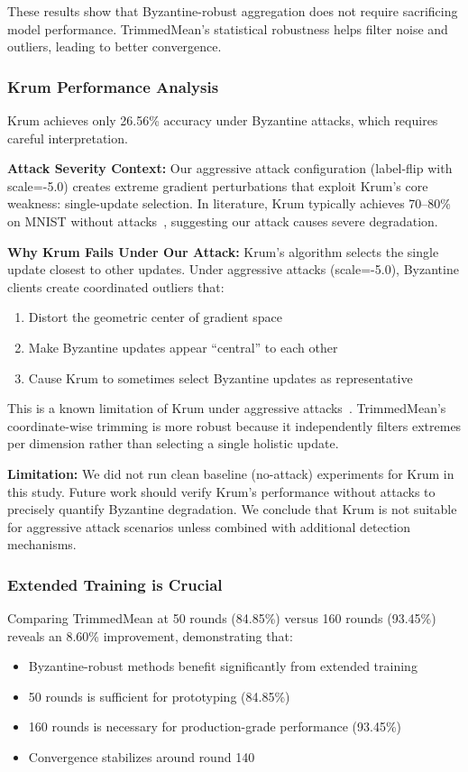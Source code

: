 \documentclass[12pt,a4paper,onecolumn]{article}
\begin{document}
These results show that Byzantine-robust aggregation does not require sacrificing model performance. TrimmedMean's statistical robustness helps filter noise and outliers, leading to better convergence.

\subsubsection{Krum Performance Analysis}

Krum achieves only 26.56\% accuracy under Byzantine attacks, which requires careful interpretation. 

\textbf{Attack Severity Context:} Our aggressive attack configuration (label-flip with scale=-5.0) creates extreme gradient perturbations that exploit Krum's core weakness: single-update selection. In literature, Krum typically achieves 70--80\% on MNIST without attacks~\cite{blanchard2017machine}, suggesting our attack causes severe degradation.

\textbf{Why Krum Fails Under Our Attack:} Krum's algorithm selects the single update closest to other updates. Under aggressive attacks (scale=-5.0), Byzantine clients create coordinated outliers that:
\begin{enumerate}
    \item Distort the geometric center of gradient space
    \item Make Byzantine updates appear ``central'' to each other
    \item Cause Krum to sometimes select Byzantine updates as representative
\end{enumerate}

This is a known limitation of Krum under aggressive attacks~\cite{baruch2019little}. TrimmedMean's coordinate-wise trimming is more robust because it independently filters extremes per dimension rather than selecting a single holistic update. 

\textbf{Limitation:} We did not run clean baseline (no-attack) experiments for Krum in this study. Future work should verify Krum's performance without attacks to precisely quantify Byzantine degradation. We conclude that Krum is not suitable for aggressive attack scenarios unless combined with additional detection mechanisms.

\subsubsection{Extended Training is Crucial}

Comparing TrimmedMean at 50 rounds (84.85\%) versus 160 rounds (93.45\%) reveals an 8.60\% improvement, demonstrating that:
\begin{itemize}
    \item Byzantine-robust methods benefit significantly from extended training
    \item 50 rounds is sufficient for prototyping (84.85\%)
    \item 160 rounds is necessary for production-grade performance (93.45\%)
    \item Convergence stabilizes around round 140
\end{itemize}
\end{document}
